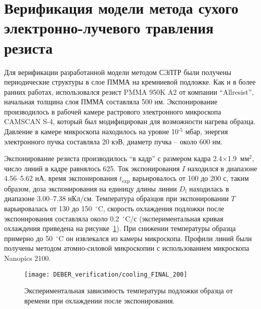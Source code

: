 \section{Верификация модели метода сухого электронно-лучевого травления резиста} \label{sec:verification}

Для верификации разработанной модели методом СЭЛТР были получены периодические структуры в слое ПММА на кремниевой подложке. Как и в более ранних работах, использовался резист PMMA 950K A2 от компании ``Allresist'', начальная толщина слоя ПММА составляла 500 нм. Экспонирование производилось в рабочей камере растрового электронного микроскопа CAMSCAN S-4, который был модифицирован для возможности нагрева образца. Давление в камере микроскопа находилось на уровне 10$^{\text{-5}}$ мбар, энергия электронного пучка составляла 20 кэВ, диаметр пучка -- около 600 нм.

Экспонирование резиста производилось ``в кадр'' с размером кадра 2.4$\times$1.9~мм$^\text{2}$, число линий в кадре равнялось 625. Ток экспонирования $I$ находился в диапазоне 4.56--5.62 нА, время экспонирования $t_\mathrm{exp}$ варьировалось от 100 до 200 с, таким образом, доза экспонирования на единицу длины линии $D_\mathrm{l}$ находилась в диапазоне 3.00--7.38 нКл/см. Температура образцов при экспонировании $T$ варьировалась от 130 до 150~$^\circ$C, скорость охлаждения подложки после экспонирования составляла около 0.2~$^\circ$C/с (экспериментальная кривая охлаждения приведена на рисунке~\ref{fig:exp_cooling}). При снижении температуры образца примерно до 50~$^\circ$C он извлекался из камеры микроскопа. Профили линий были получены методом атомно-силовой микроскопии с использованием микроскопа Nanopics 2100.

\begin{figure}[h!]
	\begin{center}
		\texttt{[image: DEBER\_verification/cooling\_FINAL\_200]} \\
	\end{center}
	\vspace{-1em}
	\caption{Экспериментальная зависимость температуры подложки образца от времени при охлаждении после экспонирования.}
	\label{fig:exp_cooling}
	\vspace{1em}
\end{figure}


